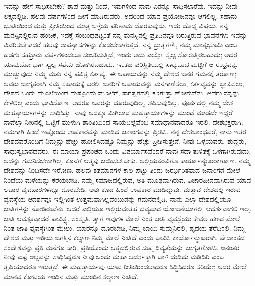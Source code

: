 ಇದನ್ನು ಹೇಗೆ ಸಾಧಿಸಬೇಕು? ಶಾಪ ಮತ್ತು ನಿಂದೆ, ಇವುಗಳಿಂದ ನಾವು ಏನನ್ನೂ ಸಾಧಿಸಲಾರೆವು. ಇದನ್ನು ನೀವು ಲಕ್ಷ್ಯದಲ್ಲಿಡಿ. ಹಲವು ವರ್ಷಗಳಿಂದ ಹೀಗೆ ಮಾಡಿರುವರು. ಅದರಿಂದ ಯಾವ ಪ್ರಯೋಜನವೂ ಆಗಲಿಲ್ಲ. ಸಹಾನು ಭೂತಿಯಿಂದ ಮತ್ತು ಪ್ರೀತಿಯಿಂದ ಮಾತ್ರ ಒಳ್ಳೆಯ ಪರಿಣಾಮ ದೊರಕುವುದು. ಇದು ದೊಡ್ಡ ವಿಷಯ. ನನ್ನ ಮನಸ್ಸಿನಲ್ಲಿರುವ ಹಂಚಿಕೆ, ಇದಕ್ಕೆ ಸಂಬಂಧಪಟ್ಟಂತೆ ನನ್ನ ಮನಸ್ಸಿನಲ್ಲಿ ಪ್ರತಿದಿನವೂ ಬರುತ್ತಿರುವ ಭಾವನೆಗಳು ಇವನ್ನು ವಿವರಿಸಬೇಕಾದರೆ ಹಲವು ಉಪನ್ಯಾಸಗಳನ್ನು ಕೊಡಬೇಕಾಗುತ್ತದೆ. ನನ್ನ ಭ್ರಾತೃಗಳೇ, ನಮ್ಮ ಮಾತೃಭೂಮಿ ಎಂಬ ಹಡಗು ಸಹಸ್ರಾರು ವರ್ಷಗಳಿಂದಲೂ ಸಂಚರಿಸುತ್ತಿದೆ, ಇಂದು ಅದು ಎಲ್ಲೋ ಸ್ವಲ್ಪ ಸೋರುತ್ತಿರಬಹುದು; ಅದರ ಯಾವುದೋ ಭಾಗ ಸ್ವಲ್ಪ ಸವೆದು ಹೋಗಿರಬಹುದು. ಇಂತಹ ಪರಿಸ್ಥಿತಿಯಲ್ಲಿ ಸಾಧ್ಯವಾದ ಮಟ್ಟಿಗೆ ಆ ರಂಧ್ರವನ್ನು ಮುಚ್ಚುವುದು ನಿಮ್ಮ ಮತ್ತು ನನ್ನ ಪವಿತ್ರ ಕರ್ತವ್ಯ. ಈ ಅಪಾಯವನ್ನು ನಮ್ಮ ದೇಶದ ಜನರ ಗಮನಕ್ಕೆ ತರೋಣ; ಅವರು ಜಾಗೃತರಾಗಿ ನಮ್ಮ ಸಹಾಯಕ್ಕೆ ಬರಲಿ. ಜನರಿಗೆ ಅಪಾಯವನ್ನು ಮನಗಾಣಿಸಲು, ಕರ್ತವ್ಯವನ್ನು ಜ್ಞಾಪಿಸಲು, ದೇಶದ ಒಂದು ಮೂಲೆಯಿಂದ ಮತ್ತೊಂದು ಮೂಲೆಗೆ, ತಾರಸ್ವರದಲ್ಲಿ ಕೂಗುತ್ತಾ ಹೋಗುವೆನು. ಅವರು ನನ್ನನ್ನು ಕೇಳಲಿಲ್ಲ ಎಂದು ಭಾವಿಸೋಣ. ಆದರೂ ಅವರನ್ನು ದೂರುವುದಿಲ್ಲ, ಶಪಿಸುವುದಿಲ್ಲ. ಪೂರ್ವದಲ್ಲಿ ನಮ್ಮ ದೇಶ ಮಹತ್ಕಾರ್ಯಗಳನ್ನು ಸಾಧಿಸಿತ್ತು. ನಾವು ಅದಕ್ಕೂ ಮಿಗಿಲಾದ ಮಹತ್ಕಾರ್ಯಗಳನ್ನು ಮುಂದೆ ಮಾಡದೇ ಇದ್ದರೆ ನಾವೆಲ್ಲಾ ನೀರಿನಲ್ಲಿ ಒಟ್ಟಿಗೆ ಮುಳುಗಿ ಶಾಂತಿಯಿಂದ ಸಾಯಬಲ್ಲೆವೆಂಬ ಸಮಾಧಾನವಾದರೂ ಇರಲಿ. ದೇಶಭಕ್ತರಾಗಿ; ನಮಗಾಗಿ ಹಿಂದೆ ಇಷ್ಟೊಂದು ಉಪಕಾರವನ್ನು ಮಾಡಿದ ಜನಾಂಗವನ್ನು ಪ್ರೀತಿಸಿ. ನನ್ನ ದೇಶಬಾಂಧವರೆ, ನಾನು ಇತರ ದೇಶದವರೊಂದಿಗೆ ನಿಮ್ಮನ್ನು ಹೆಚ್ಚು ಹೋಲಿಸಿದಷ್ಟೂ ನಿಮ್ಮನ್ನು ಹೆಚ್ಚು ಪ್ರೀತಿಸುತ್ತೇನೆ. ನೀವು ಒಳ್ಳೆಯವರು, ಶುದ್ಧರು, ಸಾಧುಸ್ವಭಾವದವರು. ಈ ಮಾಯಾ ಪ್ರಪಂಚದ ಒಂದು ವಿಪರ್ಯಾಸವೆಂದರೆ ನಾವು ಸದಾ ತುಳಿತಕ್ಕೆ ಒಳಗಾಗಿರುವುದು. ಅದನ್ನು ಗಮನಿಸಬೇಕಾಗಿಲ್ಲ. ಕೊನೆಗೆ ಆತ್ಮವು ಜಯಿಸಲೇಬೇಕು. ಅಲ್ಲಿಯವರೆವಿಗೂ ಕಾರ್ಯೋನ್ಮುಖರಾಗೋಣ. ನಮ್ಮ ದೇಶವನ್ನು ನಿಂದಿಸದೇ ಇರೋಣ. ಹಲವು ಶತಮಾನಗಳ ಕಾಲ ಪೆಟ್ಟು ತಿಂದು ಜರ್ಝರಿತವಾದ ಜನಾಂಗದ ಮೇಲೆ ನಿಂದೆಯ ಮಳೆಯನ್ನು ಕರೆಯಬೇಡಿ. ನಮ್ಮ ಸಮಾಜದಲ್ಲಿರುವ, ಅತಿ ಮೂಢವಾಗಿರುವ, ವಿಚಾರಹೀನವಾಗಿರುವ ಯಾವ ಆಚಾರ ವ್ಯವಹಾರಗಳನ್ನೂ ದೂರಬೇಡಿ. ಅವು ಕೂಡ ಹಿಂದೆ ಉಪಕಾರ ಮಾಡಿದ್ದುವು. ಮತ್ತಾವ ದೇಶದಲ್ಲಿ ಇರುವ ವ್ಯವಸ್ಥೆಯ ಆದರ್ಶವೂ ಇಲ್ಲಿಗಿಂತ ಉತ್ತಮವಾಗಿಲ್ಲವೆಂಬುದನ್ನು ಗಮನದಲ್ಲಿಡಿ. ನಾನು ಎಲ್ಲಾ ದೇಶದಲ್ಲಿಯೂ ಜಾತಿಗಳನ್ನು ನೋಡಿರುವೆನು. ಆದರೆ ಎಲ್ಲಿಯೂ ಇಲ್ಲಿರುವಂತಹ ಭವ್ಯವಾದ ಯೋಜನೆಯಾಗಲಿ, ಆದರ್ಶವಾಗಲಿ ಇಲ್ಲ. ಜಾತಿ ಆವಶ್ಯಕವಾದರೆ ಪಾವಿತ್ರ್ಯ. ಸಂಸ್ಕೃತಿ, ತ್ಯಾಗ ಇವುಗಳ ಮೇಲೆ ನಿಂತ ಜಾತಿ ವ್ಯವಸ್ಥೆಯು ಕೇವಲ ಹಣದ ಮೇಲೆ ನಿಂತ ಜಾತಿ ವ್ಯವಸ್ಥೆಗಿಂತ ಮೇಲು. ಯಾರನ್ನೂ ದೂರಬೇಡಿ, ನಿಮ್ಮ ಬಾಯಿ ಸುಮ್ಮನಿರಲಿ, ಹೃದಯ ತೆರೆದಿರಲಿ. ನಿಮ್ಮ ದೇಶದ ಮತ್ತು ಇಡಿಯ ಜಗತ್ತಿನ ಕಲ್ಯಾಣ ನಿಮ್ಮ ಮೇಲೆ ನಿಂತಿದೆ ಎಂದು ಭಾವಿಸಿ ಕಾರ್ಯೋನ್ಮುಖರಾಗಿ. ವೇದಾಂತದ ಸಂದೇಶವನ್ನು ಪ್ರತಿ ಮನೆಗೂ ಸಾರಿ. ಪ್ರತಿಯೊಂದು ಆತ್ಮದಲ್ಲಿರುವ ಸುಪ್ತ ದಿವ್ಯತೆಯನ್ನು ಜಾಗೃತಗೊಳಿಸಿ. ಅನಂತರ ನೀವು ಎಷ್ಟೆ ಅಲ್ಪವನ್ನು ಸಾಧಿಸಿದ್ದರೂ ನೀವು ಒಂದು ಮಹಾ ಆದರ್ಶಕ್ಕಾಗಿ ಬಾಳಿ ದುಡಿದು ಮಡಿದಿರಿ ಎಂಬ ತೃಪ್ತಿಯಾದರೂ ಇರುತ್ತದೆ. ಈ ಮಹತ್ಕಾರ್ಯವು ಯಾವ ರೀತಿಯಿಂದಲಾದರೂ ಸಿದ್ಧಿಸಿದರೂ ಸರಿಯೇ; ಅದರ ಮೇಲೆ ಮಾನವ ಕೋಟಿಯ ಇಂದಿನ ಮತ್ತು ಮುಂದಿನ ಕಲ್ಯಾಣ ನಿಂತಿದೆ.

